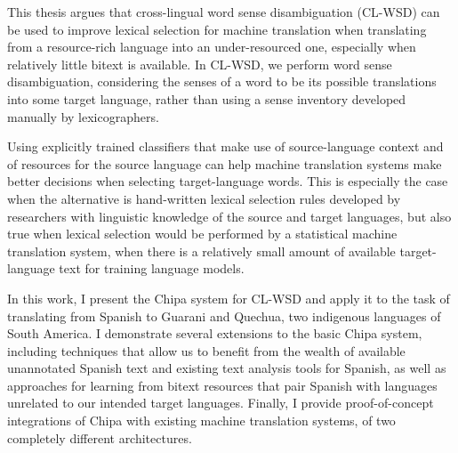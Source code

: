 This thesis argues that cross-lingual word sense disambiguation (CL-WSD) can be
used to improve lexical selection for machine translation when translating from
a resource-rich language into an under-resourced one, especially when relatively
little bitext is available.  In CL-WSD, we perform word sense disambiguation,
considering the senses of a word to be its possible translations into some
target language, rather than using a sense inventory developed manually by
lexicographers.

Using explicitly trained classifiers that make use of source-language context
and of resources for the source language can help machine translation systems
make better decisions when selecting target-language words. This is especially
the case when the alternative is hand-written lexical selection rules developed
by researchers with linguistic knowledge of the source and target languages, but
also true when lexical selection would be performed by a statistical machine
translation system, when there is a relatively small amount of available
target-language text for training language models.

In this work, I present the Chipa system for CL-WSD and apply it to the task of
translating from Spanish to Guarani and Quechua, two indigenous languages of
South America. I demonstrate several extensions to the basic Chipa system,
including techniques that allow us to benefit from the wealth of available
unannotated Spanish text and existing text analysis tools for Spanish, as well
as approaches for learning from bitext resources that pair Spanish with
languages unrelated to our intended target languages. Finally, I provide
proof-of-concept integrations of Chipa with existing machine translation
systems, of two completely different architectures.
